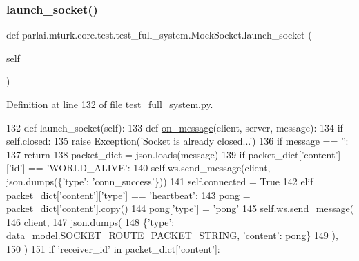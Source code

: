 \subsubsection{\texorpdfstring{launch\+\_\+socket()}{launch\_socket()}}
{\footnotesize\ttfamily def parlai.\+mturk.\+core.\+test.\+test\+\_\+full\+\_\+system.\+Mock\+Socket.\+launch\+\_\+socket (\begin{DoxyParamCaption}\item[{}]{self }\end{DoxyParamCaption})}



Definition at line 132 of file test\+\_\+full\+\_\+system.\+py.


\begin{DoxyCode}
132     \textcolor{keyword}{def }launch\_socket(self):
133         \textcolor{keyword}{def }\hyperlink{namespaceparlai_1_1chat__service_1_1services_1_1terminal__chat_1_1client_a0ef2bb2bd3b966dcdd8402a92b999708}{on\_message}(client, server, message):
134             \textcolor{keywordflow}{if} self.closed:
135                 \textcolor{keywordflow}{raise} Exception(\textcolor{stringliteral}{'Socket is already closed...'})
136             \textcolor{keywordflow}{if} message == \textcolor{stringliteral}{''}:
137                 \textcolor{keywordflow}{return}
138             packet\_dict = json.loads(message)
139             \textcolor{keywordflow}{if} packet\_dict[\textcolor{stringliteral}{'content'}][\textcolor{stringliteral}{'id'}] == \textcolor{stringliteral}{'WORLD\_ALIVE'}:
140                 self.ws.send\_message(client, json.dumps(\{\textcolor{stringliteral}{'type'}: \textcolor{stringliteral}{'conn\_success'}\}))
141                 self.connected = \textcolor{keyword}{True}
142             \textcolor{keywordflow}{elif} packet\_dict[\textcolor{stringliteral}{'content'}][\textcolor{stringliteral}{'type'}] == \textcolor{stringliteral}{'heartbeat'}:
143                 pong = packet\_dict[\textcolor{stringliteral}{'content'}].copy()
144                 pong[\textcolor{stringliteral}{'type'}] = \textcolor{stringliteral}{'pong'}
145                 self.ws.send\_message(
146                     client,
147                     json.dumps(
148                         \{\textcolor{stringliteral}{'type'}: data\_model.SOCKET\_ROUTE\_PACKET\_STRING, \textcolor{stringliteral}{'content'}: pong\}
149                     ),
150                 )
151             \textcolor{keywordflow}{if} \textcolor{stringliteral}{'receiver\_id'} \textcolor{keywordflow}{in} packet\_dict[\textcolor{stringliteral}{'content'}]:

\end{DoxyCode}

